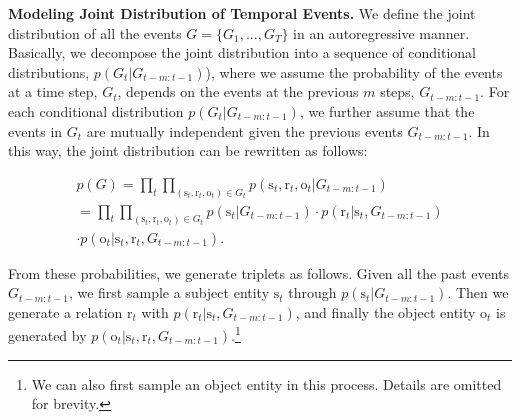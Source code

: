 \documentclass[11pt,a4paper]{article}
\newcommand{\prob}{p}
\newcommand{\calE}{G}
\newcommand{\para}[1]{\smallskip\noindent\textbf{#1}}
\newcommand{\bs}{\mathrm{s}}
\newcommand{\br}{\mathrm{r}}
\newcommand{\bo}{\mathrm{o}}
\begin{document}
\para{Modeling Joint Distribution of Temporal Events.}
We define the joint distribution of all the events $\calE = \{\calE_{1}, ..., \calE_{T}\}$ in an autoregressive manner.
Basically, we decompose the joint distribution into a sequence of conditional distributions, $\prob(\calE_t|\calE_{t-m:t-1})$), where 
we assume the probability of the events at a time step, $\calE_t$, depends on the events at the previous $m$ steps, $\calE_{t-m:t-1}$. 
For each conditional distribution $\prob(\calE_t|\calE_{t-m:t-1})$, we further assume that the events in $\calE_t$ are mutually independent given the previous events $\calE_{t-m:t-1}$. In this way, the joint distribution can be rewritten as follows:

\small
\begin{multline}
\label{eq:prob_event_t}
    \prob(\calE)= \prod_{t}\prod_{(\bs_t,\br_t,\bo_t)\in\calE_{t}}  \prob(\bs_t,\br_t,\bo_t|\calE_{t-m:t-1})\\
    = \prod_t \prod_{(\bs_t,\br_t,\bo_t)\in\calE_t} 
    \prob(\bs_t |\calE_{t-m:t-1})
    \cdot \prob(\br_t |\bs_t, \calE_{t-m:t-1})\\
    \cdot \prob(\bo_t|\bs_t,\br_t,\calE_{t-m:t-1}).
\end{multline}
\normalsize



From these probabilities, we generate triplets as follows.
Given all the past events $\calE_{t-m:t-1}$, we first sample a subject entity $\bs_t$ through $\prob(\bs_t |\calE_{t-m:t-1})$. Then we generate a relation $\br_t$ with $\prob(\br_t |\bs_t, \calE_{t-m:t-1})$, and finally the object entity $\bo_t$ is generated by $\prob(\bo_t|\bs_t,\br_t,\calE_{t-m:t-1})$.\footnote{We can also first sample an object entity in this process. Details are omitted for brevity.}

\end{document}

